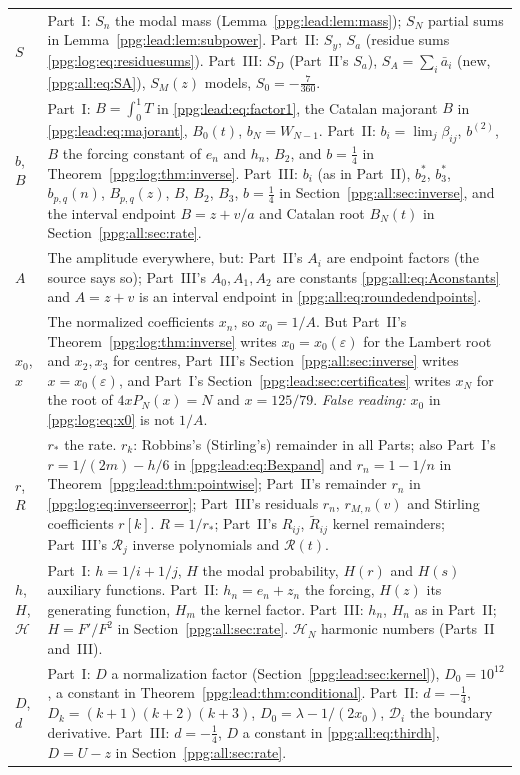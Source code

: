 \documentclass[11pt,letterpaper]{article}
\theoremstyle{remark}\newtheorem{remark}[theorem]{Remark}
\numberwithin{equation}{section}
\newcommand{\HH}{\mathcal H}
\begin{document}
\begin{longtable}{@{}>{\raggedright\arraybackslash}p{} >{\raggedright\arraybackslash}p{}@{}}
$S$ & Part~I: $S_n$ the modal mass (Lemma~\ref{ppg:lead:lem:mass}); $S_N$ partial sums in Lemma~\ref{ppg:lead:lem:subpower}. Part~II: $S_y$, $S_a$ (residue sums \eqref{ppg:log:eq:residuesums}). Part~III: $S_D$ (Part~II's $S_a$), $S_A=\sum_i\bar a_i$ (new, \eqref{ppg:all:eq:SA}), $S_M(z)$ models, $S_0=-\frac7{360}$.\\
$b$, $B$ & Part~I: $B=\int_0^1T$ in \eqref{ppg:lead:eq:factor1}, the Catalan majorant $B$ in \eqref{ppg:lead:eq:majorant}, $B_0(t)$, $b_N=W_{N-1}$. Part~II: $b_i=\lim_j\beta_{ij}$, $b^{(2)}$, $B$ the forcing constant of $e_n$ and $h_n$, $B_2$, and $b=\frac14$ in Theorem~\ref{ppg:log:thm:inverse}. Part~III: $b_i$ (as in Part~II), $b_2^*$, $b_3^*$, $b_{p,q}(n)$, $B_{p,q}(z)$, $B$, $B_2$, $B_3$, $b=\frac14$ in Section~\ref{ppg:all:sec:inverse}, and the interval endpoint $B=z+v/a$ and Catalan root $B_N(t)$ in Section~\ref{ppg:all:sec:rate}.\\
$A$ & The amplitude everywhere, but: Part~II's $A_i$ are endpoint factors (the source says so); Part~III's $A_0,A_1,A_2$ are constants \eqref{ppg:all:eq:Aconstants} and $A=z+v$ is an interval endpoint in \eqref{ppg:all:eq:roundedendpoints}.\\
$x_0$, $x$ & The normalized coefficients $x_n$, so $x_0=1/A$. But Part~II's Theorem~\ref{ppg:log:thm:inverse} writes $x_0=x_0(\varepsilon)$ for the Lambert root and $x_2,x_3$ for centres, Part~III's Section~\ref{ppg:all:sec:inverse} writes $x=x_0(\varepsilon)$, and Part~I's Section~\ref{ppg:lead:sec:certificates} writes $x_N$ for the root of $4xP_N(x)=N$ and $x=125/79$. \emph{False reading:} $x_0$ in \eqref{ppg:log:eq:x0} is not $1/A$.\\
$r$, $R$ & $r_*$ the rate. $r_k$: Robbins's (Stirling's) remainder in all Parts; also Part~I's $r=1/(2m)-h/6$ in \eqref{ppg:lead:eq:Bexpand} and $r_n=1-1/n$ in Theorem~\ref{ppg:lead:thm:pointwise}; Part~II's remainder $r_n$ in \eqref{ppg:log:eq:inverseerror}; Part~III's residuals $r_n$, $r_{M,n}(v)$ and Stirling coefficients $r[k]$. $R=1/r_*$; Part~II's $R_{ij}$, $\widetilde R_{ij}$ kernel remainders; Part~III's $\mathcal R_j$ inverse polynomials and $\mathcal R(t)$.\\
$h$, $H$, $\HH$ & Part~I: $h=1/i+1/j$, $H$ the modal probability, $H(r)$ and $H(s)$ auxiliary functions. Part~II: $h_n=e_n+z_n$ the forcing, $H(z)$ its generating function, $H_m$ the kernel factor. Part~III: $h_n$, $H_n$ as in Part~II; $H=F'/F^2$ in Section~\ref{ppg:all:sec:rate}. $\HH_N$ harmonic numbers (Parts~II and~III).\\
$D$, $d$ & Part~I: $D$ a normalization factor (Section~\ref{ppg:lead:sec:kernel}), $D_0=10^{12}$, a constant in Theorem~\ref{ppg:lead:thm:conditional}. Part~II: $d=-\frac14$, $D_k=(k+1)(k+2)(k+3)$, $D_0=\lambda-1/(2x_0)$, $\mathcal D_i$ the boundary derivative. Part~III: $d=-\frac14$, $D$ a constant in \eqref{ppg:all:eq:thirdh}, $D=U-z$ in Section~\ref{ppg:all:sec:rate}.\\

\end{longtable}
\end{document}
